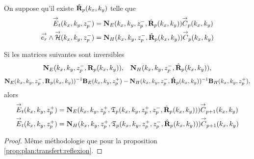     \begin{prop}%
      \label{prop:plan:relevement:reflexion}{}~

      On suppose qu'il existe \(\hat{\mathbf{R}}_{p}(k_x,k_y)\) telle que 
      \begin{align*}
        {\overset{\rightarrow}{E}}_t(k_x,k_y,z_p^-) &= \mathbf{N}_{E}(k_x,k_y,z_p^-,\hat{\mathbf{R}}_{p}(k_x,k_y)){\overset{\rightarrow}{C}}_{p}(k_x,k_y)
        \\
        {\overset{\rightarrow}{e_r}}\wedge{\overset{\rightarrow}{\mathcal{H}}}(k_x,k_y,z_p^-) &= \mathbf{N}_{H}(k_x,k_y,z_p^-,\hat{\mathbf{R}}_{p}(k_x,k_y)){\overset{\rightarrow}{C}}_{p}(k_x,k_y)
      \end{align*}

      Si les matrices suivantes sont inversibles
      \begin{align*}
        \mathbf{N}_{E}(k_x,k_y,z_p^-,\mathbf{R}_{p}(k_x,k_y)), && \mathbf{N}_{H}(k_x,k_y,z_p^-,\hat{\mathbf{R}}_{p}(k_x,k_y)),
      \end{align*}
      \begin{align*}
        \mathbf{N}_{E}(k_x,k_y,z_p^-,\mathbf{R}_{p}(k_x,k_y))^{-1}\mathbf{B}_{E}(k_x,k_y,z_p^+) - \mathbf{N}_{H}(k_x,k_y,z_p^-,\hat{\mathbf{R}}_{p}(k_x,k_y))^{-1}\mathbf{B}_{H}(k_x,k_y,z_p^+),
      \end{align*}
      alors
      \begin{align*}
        {\overset{\rightarrow}{E}}_t(k_x,k_y,z_p^+) &= \mathbf{N}_{E}(k_x,k_y,z_p^+,\mathfrak{T}_p(k_x,k_y,z_p^+,z_p^-,\hat{\mathbf{R}}_{p}(k_x,k_y))){\overset{\rightarrow}{C}}_{p+1}(k_x,k_y)
        \\
        {\overset{\rightarrow}{E}}_t(k_x,k_y,z_p^+) &= \mathbf{N}_{H}(k_x,k_y,z_p^+,\mathfrak{T}_p(k_x,k_y,z_p^+,z_p^-,\hat{\mathbf{R}}_{p}(k_x,k_y))){\overset{\rightarrow}{C}}_{p+1}(k_x,k_y)
      \end{align*}
    \end{prop}

    \begin{proof}
      Même méthodologie que pour la proposition \ref{prop:plan:transfert:reflexion}.
    \end{proof}

